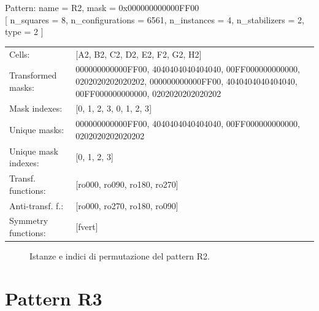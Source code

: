 \begin{tcolorbox}[sharp corners, fontupper=\ttfamily\small, colback=white]
  \noindent Pattern: name = R2, mask = 0x000000000000FF00\\
  {[} n\_squares = 8, n\_configurations = 6561,
  n\_instances = 4, n\_stabilizers = 2, type = 2 { ]}\\[1.0ex]
  \begin{tabularx}{\textwidth}{@{} p{3.5cm} X @{}}
    Cells:               & {[}A2, B2, C2, D2, E2, F2, G2, H2{]}\\[0.5ex]
    Transformed masks:   & 000000000000FF00, 4040404040404040, 00FF000000000000, 0202020202020202, 000000000000FF00, 4040404040404040, 00FF000000000000, 0202020202020202\\[0.5ex]
    Mask indexes:        & {[}0, 1, 2, 3, 0, 1, 2, 3{]}\\[0.5ex]
    Unique masks:        & 000000000000FF00, 4040404040404040, 00FF000000000000, 0202020202020202\\[0.5ex]
    Unique mask indexes: & {[}0, 1, 2, 3{]}\\[0.5ex]
    Transf. functions:   & {[}ro000, ro090, ro180, ro270{]}\\[0.5ex]
    Anti-transf. f.:     & {[}ro000, ro270, ro180, ro090{]}\\[0.5ex]
    Symmetry functions:  & {[}fvert{]}\\[0.5ex]
  \end{tabularx}
\end{tcolorbox}

\begin{figure}[htbp]
  \centering
   \hfill
   \hfill
   \hfill
  \vspace{0.3cm}
   \hfill
   \hfill
   \hfill
  \caption{Istanze e indici di permutazione del pattern R2.}
\end{figure}

\newpage

\section{Pattern R3}

